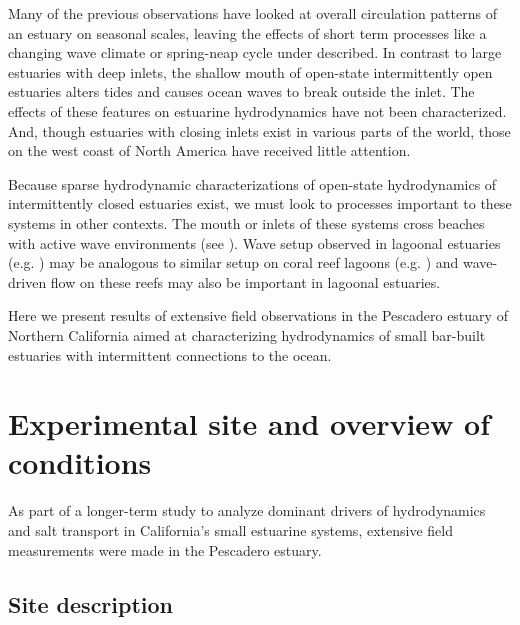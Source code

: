 Many of the previous observations have looked at overall circulation
patterns of an estuary on seasonal scales, leaving the effects of
short term processes like a changing wave climate or spring-neap
cycle under described. In contrast to large estuaries with deep
inlets, the shallow mouth of open-state intermittently open estuaries
alters tides and causes ocean waves to break outside the inlet. The
effects of these features on estuarine hydrodynamics have not been
characterized. And, though estuaries with closing inlets exist in
various parts of the world, those on the west coast of North America
have received little attention. 

Because sparse hydrodynamic characterizations of open-state hydrodynamics
of intermittently closed estuaries exist, we must look to processes
important to these systems in other contexts. The mouth or inlets
of these systems cross beaches with active wave environments (see
\cite{mei_surface_1993,battjes_surf-zone_1988}). Wave setup observed in lagoonal
estuaries (e.g. \cite{malhadas_effect_2009}) may be analogous
to similar setup on coral reef lagoons (e.g. \cite{becker_water_2014})
and wave-driven flow on these reefs \parencite{monismith_hydrodynamics_2007} may also
be important in lagoonal estuaries. 

Here we present results of extensive field observations in the Pescadero
estuary of Northern California aimed at characterizing hydrodynamics
of small bar-built estuaries with intermittent connections to the
ocean. 



\section{Experimental site and overview of conditions}

As part of a longer-term study to analyze dominant drivers of hydrodynamics
and salt transport in California's small estuarine systems, extensive
field measurements were made in the Pescadero estuary.


\subsection{Site description }

